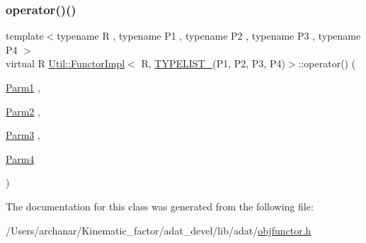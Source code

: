 \subsubsection{\texorpdfstring{operator()()}{operator()()}\hspace{0.1cm}{\footnotesize\ttfamily [2/2]}}
{\footnotesize\ttfamily template$<$typename R , typename P1 , typename P2 , typename P3 , typename P4 $>$ \\
virtual R \mbox{\hyperlink{classUtil_1_1FunctorImpl}{Util\+::\+Functor\+Impl}}$<$ R, \mbox{\hyperlink{install_2include_2adat_2typelist_8h_a7a156c571ab21a16b0495e1c882a07fa}{T\+Y\+P\+E\+L\+I\+S\+T\+\_}}(P1, P2, P3, P4)$>$\+::operator() (\begin{DoxyParamCaption}\item[{\mbox{\hyperlink{structUtil_1_1Private_1_1FunctorImplBase_a9d61e693d6c616dea5bd9d9073c7d21a}{Parm1}}}]{,  }\item[{\mbox{\hyperlink{structUtil_1_1Private_1_1FunctorImplBase_a554085cd798ef14838a59b528f0feb2e}{Parm2}}}]{,  }\item[{\mbox{\hyperlink{structUtil_1_1Private_1_1FunctorImplBase_a052148e627fd4caecbcffdbdf1033dbb}{Parm3}}}]{,  }\item[{\mbox{\hyperlink{structUtil_1_1Private_1_1FunctorImplBase_a1ad7fe3f243480c44a610927ebe76762}{Parm4}}}]{ }\end{DoxyParamCaption})\hspace{0.3cm}{\ttfamily [pure virtual]}}



The documentation for this class was generated from the following file\+:\begin{DoxyCompactItemize}
\item 
/\+Users/archanar/\+Kinematic\+\_\+factor/adat\+\_\+devel/lib/adat/\mbox{\hyperlink{lib_2adat_2objfunctor_8h}{objfunctor.\+h}}\end{DoxyCompactItemize}
